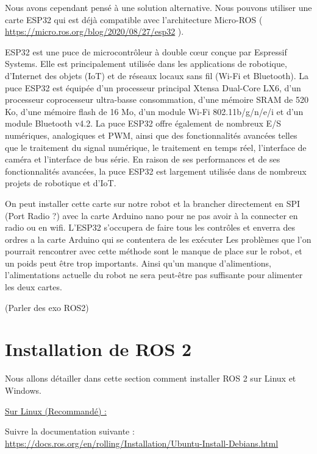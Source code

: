 Nous avons cependant pensé à une solution alternative. Nous pouvons utiliser une carte ESP32 qui est déjà compatible 
avec l’architecture Micro-ROS ( \url{https://micro.ros.org/blog/2020/08/27/esp32} ).  
\linebreak

ESP32 est une puce de microcontrôleur à double cœur conçue par Espressif Systems. Elle est principalement utilisée 
dans les applications de robotique, d'Internet des objets (IoT) et de réseaux locaux sans fil (Wi-Fi et Bluetooth). 
La puce ESP32 est équipée d'un processeur principal Xtensa Dual-Core LX6, d'un processeur coprocesseur ultra-basse consommation, 
d'une mémoire SRAM de 520 Ko, d'une mémoire flash de 16 Mo, d'un module Wi-Fi 802.11b/g/n/e/i et d'un module Bluetooth v4.2. 
La puce ESP32 offre également de nombreux E/S numériques, analogiques et PWM, ainsi que des fonctionnalités avancées telles 
que le traitement du signal numérique, le traitement en temps réel, l'interface de caméra et l'interface de bus série. 
En raison de ses performances et de ses fonctionnalités avancées, la puce ESP32 est largement utilisée dans de nombreux projets de 
robotique et d'IoT.
\linebreak
	
On peut installer cette carte sur notre robot et la brancher directement en SPI (Port Radio ?) avec la carte Arduino nano pour 
ne pas avoir à la connecter en radio ou en wifi.  
L’ESP32 s’occupera de faire tous les contrôles et enverra des ordres a la carte Arduino qui se contentera de les exécuter 
Les problèmes que l’on pourrait rencontrer avec cette méthode sont le manque de place sur le robot, et un poids peut être trop importants. 
Ainsi qu’un manque d’alimentions, l’alimentations actuelle du robot ne sera peut-être pas suffisante pour alimenter les deux cartes. 
\linebreak
	
(Parler des exo ROS2) 

		\section{Installation de ROS 2}

Nous allons détailler dans cette section comment installer ROS 2 sur Linux et Windows.
\linebreak

\underline{Sur Linux (Recommandé) :}
 
Suivre la documentation suivante :
\url{https://docs.ros.org/en/rolling/Installation/Ubuntu-Install-Debians.html}
 \linebreak

